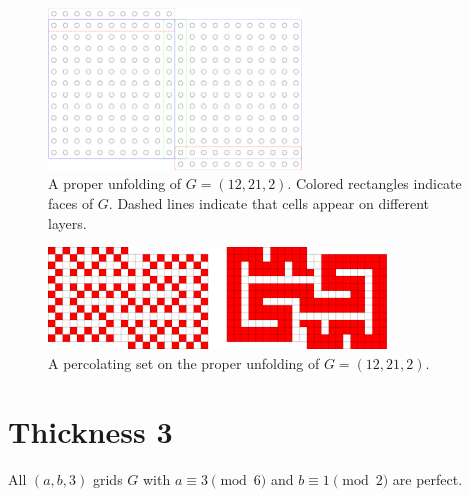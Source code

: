 \begin{figure}[]
\centering
\includegraphics[width=0.6\textwidth]{figures/4/12x21x2_unfolded.pdf}
\caption{A proper unfolding of $G= (12,21,2)$. Colored rectangles indicate faces of $G$. Dashed lines indicate that cells appear on different layers. }
\label{fig:12x21x2_unfolded}
\end{figure} 

\begin{figure}[]
\centering
\includegraphics[width=0.8\textwidth]{figures/4/12x21x2_unfolded_lethal.pdf}
\caption{A percolating set on the proper unfolding of $G= (12,21,2)$.}
\label{fig:12x21x2_unfolded_lethal}
\end{figure} 

\section{Thickness 3}

\begin{con}
All $(a,b,3)$ grids $G$ with $a \equiv 3 \pmod 6$ and $b \equiv 1 \pmod 2$ are perfect. 
\end{con}

